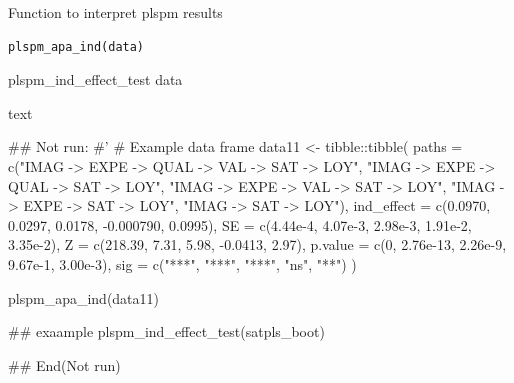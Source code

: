 \documentclass[a4paper]{book}
\begin{document}
%
\begin{Description}
Function to interpret plspm results
\end{Description}
%
\begin{Usage}
\begin{verbatim}
plspm_apa_ind(data)
\end{verbatim}
\end{Usage}
%
\begin{Arguments}
\begin{ldescription}
\item[\code{data}] plspm\_ind\_effect\_test data
\end{ldescription}
\end{Arguments}
%
\begin{Value}
text
\end{Value}
%
\begin{Examples}
\begin{ExampleCode}

\#\# Not run: 
#'
# Example data frame
data11 <- tibble::tibble(
  paths = c("IMAG -> EXPE -> QUAL -> VAL -> SAT -> LOY",
            "IMAG -> EXPE -> QUAL -> SAT -> LOY",
            "IMAG -> EXPE -> VAL -> SAT -> LOY",
            "IMAG -> EXPE -> SAT -> LOY",
            "IMAG -> SAT -> LOY"),
  ind_effect = c(0.0970, 0.0297, 0.0178, -0.000790, 0.0995),
  SE = c(4.44e-4, 4.07e-3, 2.98e-3, 1.91e-2, 3.35e-2),
  Z = c(218.39, 7.31, 5.98, -0.0413, 2.97),
  p.value = c(0, 2.76e-13, 2.26e-9, 9.67e-1, 3.00e-3),
  sig = c("***", "***", "***", "ns", "**")
)

plspm_apa_ind(data11)

## exaample
plspm_ind_effect_test(satpls_boot)%


## End(Not run)
\end{ExampleCode}
\end{Examples}
\end{document}
